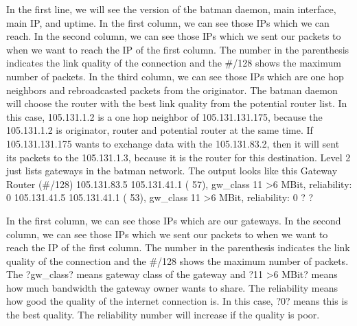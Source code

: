 \documentclass[
	12pt,
	a4paper,
	twoside,
	english,
	headsepline,
	footnosepline,
	automark,
	normalheadings,
	openany,
	cleardoubleplain,
	abstracton,
	idxtotoc,
	liststotoc,
	bibtotoc,
 	BCOR8mm,
]{scrartcl}
\begin{document}
In the first line, we will see the version of the batman daemon, main interface, main  IP, and uptime. In the first column, we can see those IPs  which we can reach. In the second column, we can see those IPs which we sent our packets to when we  want to reach the IP of the first column. The number in the parenthesis indicates the  link quality of the connection and the \#/128 shows the maximum number of packets. In the third column, we can see those IPs which are one hop neighbors and  rebroadcasted packets from the originator. The batman daemon will choose the router  with the best link quality from the potential router list.  In this case, 105.131.1.2 is a one hop neighbor of 105.131.131.175, because the 105.131.1.2  is  originator, router and potential router at the same time. If 105.131.131.175 wants to exchange  data with the 105.131.83.2, then it will sent its packets to the 105.131.1.3, because it is the  router for this destination. Level 2 just lists gateways in the batman network. The output looks like this Gateway              Router (\#/128)   105.131.83.5       105.131.41.1 ( 57), gw\_class 11   >6 MBit, reliability: 0   105.131.41.5       105.131.41.1 ( 53), gw\_class 11   >6 MBit, reliability: 0
? ?

In the first column, we can see those IPs  which are our gateways. In the second column, we can see those IPs which we sent our packets to when we  want to reach the IP of the first column. The number in the parenthesis indicates the  link quality of the connection and the \#/128 shows the maximum number of packets.  The ?gw\_class? means gateway class of the gateway and ?11  >6 MBit? means how  much bandwidth the gateway owner wants to share. The reliability means how good  the quality of the internet connection is. In this case, ?0? means this is the best  quality. The reliability number will increase if the quality is poor.
\end{document}
